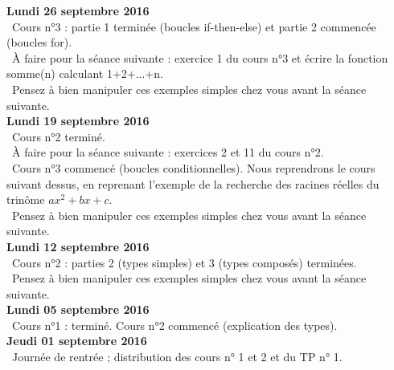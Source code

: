 \documentclass[12pt,a4paper]{article}
\begin{document}
\noindent\textbf{Lundi 26 septembre 2016 }\\
\bu\ Cours n°3 : partie 1 terminée (boucles if-then-else) et partie 2 commencée (boucles for). \\
\bu\ À faire pour la séance suivante : exercice 1 du cours n°3 et écrire la fonction somme(n) calculant 1+2+...+n. \\
\bu\ Pensez à bien manipuler ces exemples simples chez vous avant la séance suivante. \vspace{.4cm}\\


\noindent\textbf{Lundi 19 septembre 2016 }\\
\bu\ Cours n°2 terminé. \\
\bu\ À faire pour la séance suivante : exercices 2 et 11 du cours n°2. \\
\bu\ Cours n°3 commencé (boucles conditionnelles). Nous reprendrons le cours suivant dessus, en reprenant l'exemple de la recherche des racines réelles du trinôme $ax^2+bx+c$. \\
\bu\ Pensez à bien manipuler ces exemples simples chez vous avant la séance suivante. \vspace{.4cm}\\

\noindent\textbf{Lundi 12 septembre 2016 }\\
\bu\ Cours n°2 : parties 2 (types simples) et 3 (types composés) terminées. \\
\bu\ Pensez à bien manipuler ces exemples simples chez vous avant la séance suivante. \vspace{.4cm}\\

\noindent\textbf{Lundi 05 septembre 2016 }\\
\bu\ Cours n°1 : terminé. Cours n°2 commencé (explication des types). \vspace{.4cm}\\

\noindent\textbf{Jeudi 01 septembre 2016 }\\
\bu\ Journée de rentrée ; distribution des cours n° 1 et 2 et du TP n° 1. 

\label{end}
\end{document}
